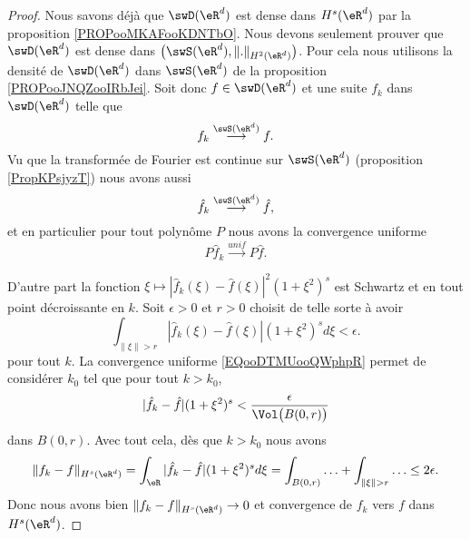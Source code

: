 \begin{proof}
    Nous savons déjà que \( \swD(\eR^d)\) est dense dans \( H^s(\eR^d)\) par la proposition \ref{PROPooMKAFooKDNTbO}. Nous devons seulement prouver que \( \swD(\eR^d)\) est dense dans \( \big( \swS(\eR^d),\| . \|_{H^2(\eR^d)} \big)\). Pour cela nous utilisons la densité de \( \swD(\eR^d)\) dans \( \swS(\eR^d)\) de la proposition \ref{PROPooJNQZooIRbJei}. Soit donc \( f\in\swD(\eR^d)\) et une suite \( f_k\) dans \( \swD(\eR^d)\) telle que
    \begin{equation}
        f_k\stackrel{\swS(\eR^d)}{\longrightarrow}f.
    \end{equation}
    Vu que la transformée de Fourier est continue sur \( \swS(\eR^d)\) (proposition \ref{PropKPsjyzT}) nous avons aussi
    \begin{equation}
        \hat f_k\stackrel{\swS(\eR^d)}{\longrightarrow}\hat f,
    \end{equation}
    et en particulier pour tout polynôme \( P\) nous avons la convergence uniforme
    \begin{equation}        \label{EQooDTMUooQWphpR}
        P\hat f_k\stackrel{unif}{\longrightarrow}P\hat f.
    \end{equation}

    D'autre part la fonction \( \xi\mapsto | \hat f_k(\xi)-\hat f(\xi) |^2(1+\xi^2)^s\) est Schwartz et en tout point décroissante en \( k\). Soit \( \epsilon>0\) et \( r>0\) choisit de telle sorte à avoir
    \begin{equation}
        \int_{\| \xi \|>r}| \hat f_{k}(\xi)-\hat f(\xi) |(1+\xi^2)^sd\xi<\epsilon.
    \end{equation}
    pour tout \( k\). La convergence uniforme \eqref{EQooDTMUooQWphpR} permet de considérer \( k_0\) tel que  pour tout \( k>k_0\),
    \begin{equation}
        | \hat f_k-\hat f |(1+\xi^2)^s< \frac{ \epsilon }{ \Vol\big( B(0,r) \big) }
    \end{equation}
    dans \( B(0,r)\). Avec tout cela, dès que \( k>k_0\) nous avons
    \begin{equation}
        \| f_k-f \|_{H^s(\eR^d)}=\int_{\eR}| \hat f_k-\hat f |(1+\xi^2)^sd\xi=\int_{B(0,r)}\ldots +\int_{\| \xi \|>r}\ldots\leq 2\epsilon.
    \end{equation}
    Donc nous avons bien \( \| f_k-f \|_{H^s(\eR^d)}\to 0\) et convergence de \( f_k\) vers \( f\) dans \( H^s(\eR^d)\).
\end{proof}

